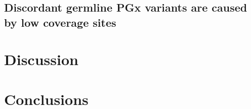 \documentclass{bmcart}
\begin{document}
\subsection*{Discordant germline PGx variants are caused by low coverage sites}


\section*{Discussion}

\section*{Conclusions}

\end{document}

